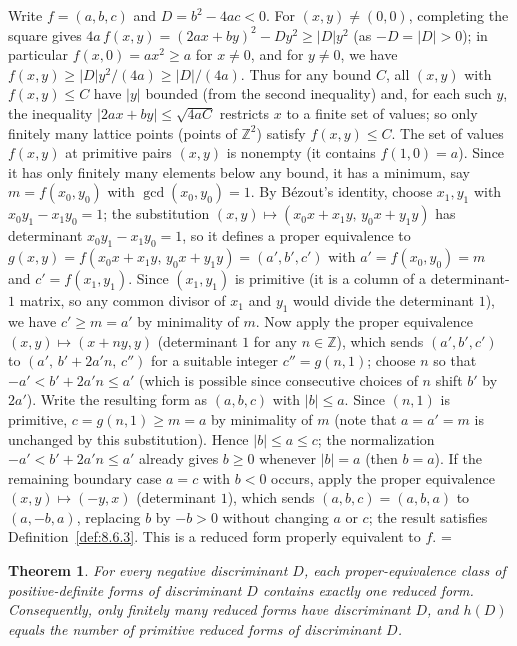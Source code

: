 \documentclass[11pt]{article}
\makeatletter
\theoremstyle{ntstyle}
\newtheorem{theorem}{Theorem}[subsection]
\let\nt@closedisplay\]
\def\nt@guardedclose{\@ifnextchar\par{\nt@closeafterpar}{\@ifnextchar\end{\postdisplaypenalty\@M\nt@closedisplay}{\nt@closedisplay}}}
\def\nt@closeafterpar\par{\@ifnextchar\par{\nt@closeafterpar}{\@ifnextchar\end{\postdisplaypenalty\@M\nt@closedisplay\par}{\nt@closedisplay\par}}}
\renewenvironment{proof}[1][\proofname]{\par
  \pushQED{\qed}\normalfont\topsep\medskipamount\edef\nt@afterproof{\@endparpenalty=\the\@endparpenalty\relax}\@beginparpenalty\@M\@endparpenalty\@M\let\]\nt@guardedclose\trivlist\item[]\textit{#1\@addpunct{.}} \ignorespaces}{\ifvmode\addpenalty\@M\fi\popQED\nt@afterproof\endtrivlist\@endpefalse}
\makeatother
\begin{document}
\begin{proof} Write $f=(a,b,c)$ and $D=b^2-4ac<0$. For
	$(x,y)\neq(0,0)$, completing the square gives
	$4a\,f(x,y)=(2ax+by)^2-Dy^2\ge|D|y^2$ (as $-D=|D|>0$); in particular
	$f(x,0)=ax^2\ge a$ for $x\neq0$, and for $y\neq0$,
	we have $f(x,y)\ge|D|y^2/(4a)\ge|D|/(4a)$. Thus for any bound $C$, all
	$(x,y)$ with $f(x,y)\le C$ have $|y|$ bounded (from the second
	inequality) and, for each such $y$, the inequality $|2ax+by|\le\sqrt{4aC}$ restricts
	$x$ to a finite set of values; so only finitely many lattice points (points of $\mathbb{Z}^2$)
	satisfy $f(x,y)\le C$. The set of values $f(x,y)$ at primitive pairs $(x,y)$ is nonempty (it
	contains $f(1,0)=a$). Since it has only
	finitely many elements below any bound, it has a minimum, say $m=f(x_0,y_0)$ with
	$\gcd(x_0, y_0)=1$. By B{\'e}zout's identity, choose $x_1,y_1$ with $x_0y_1-x_1y_0=1$;
	the substitution $(x,y)\mapsto(x_0x+x_1y,\,y_0x+y_1y)$ has
	determinant $x_0y_1-x_1y_0=1$, so it defines a proper equivalence to
	$g(x,y)=f(x_0x+x_1y,\,y_0x+y_1y)=(a',b',c')$ with $a'=f(x_0,y_0)=m$
	and $c'=f(x_1,y_1)$. Since $(x_1,y_1)$ is primitive (it is a column of a
	determinant-$1$ matrix, so any common divisor of $x_1$ and $y_1$ would
	divide the determinant $1$), we have $c'\ge m=a'$ by minimality of $m$. Now apply the
	proper equivalence $(x,y)\mapsto(x+ny,y)$ (determinant $1$ for any
	$n\in\mathbb{Z}$), which sends $(a',b',c')$ to $(a',\,b'+2a'n,\,c'')$
	for a suitable integer $c''=g(n,1)$; choose $n$ so that
	$-a'<b'+2a'n\le a'$ (which is possible since consecutive choices of $n$ shift
	$b'$ by $2a'$). Write the resulting form as $(a,b,c)$ with $|b|\le a$. Since $(n,1)$ is primitive,
	$c=g(n,1)\ge m=a$ by minimality of
	$m$ (note that $a=a'=m$ is unchanged by this substitution). Hence $|b|\le a\le c$; the normalization
	$-a'<b'+2a'n\le a'$ already gives $b\ge0$ whenever $|b|=a$ (then
	$b=a$). If the remaining boundary case $a=c$ with $b<0$ occurs, apply the proper equivalence
	$(x,y)\mapsto(-y,x)$ (determinant $1$), which sends $(a,b,c)=(a,b,a)$ to $(a,-b,a)$, replacing
	$b$ by $-b>0$ without changing $a$ or $c$; the result satisfies Definition~\ref{def:8.6.3}. This is a reduced
	form properly equivalent to $f$.
\end{proof}

\begin{theorem}\label{thm:8.6.3}
	For every negative discriminant $D$, each proper-equivalence class of positive-definite forms of
	discriminant $D$ contains exactly one reduced form. Consequently, only finitely many reduced forms
	have discriminant $D$, and $h(D)$ equals the number of primitive reduced forms of discriminant $D$.
\end{theorem}
\end{document}
